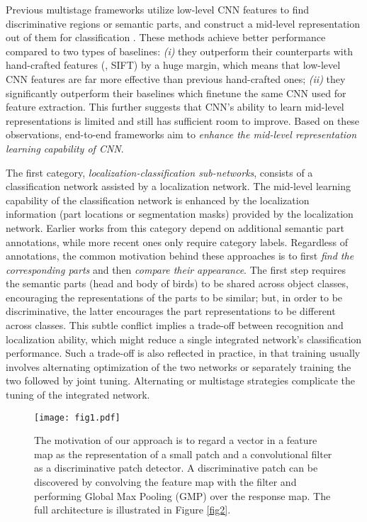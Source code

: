 \documentclass[10pt,twocolumn,letterpaper]{article}
\begin{document}
Previous multistage frameworks utilize low-level CNN features to find discriminative regions or semantic parts,
and construct a mid-level representation out of them for classification \cite{krause15, 2attention, neural_act,
mgd, deepresp, tripmine}. These methods achieve better performance compared to two types of baselines: \textit{(i)}
they outperform their counterparts with hand-crafted features
(\eg, SIFT) by a huge margin, which means that low-level CNN features are far more effective than previous hand-crafted ones;
\textit{(ii)} they significantly outperform their baselines which finetune the same CNN used for feature extraction.
This further suggests that CNN's ability to learn mid-level representations is limited and still has sufficient room to improve.
Based on these observations, end-to-end frameworks aim to \textit{enhance the mid-level representation learning capability of CNN}.

The first category, \textit{localization-classification sub-networks}, consists of a
classification network assisted by a localization network. The mid-level learning capability of the
classification network is enhanced by the localization information (\eg part locations or segmentation masks) provided by 
the localization network. Earlier works from this category \cite{fg_rcnn, deeplac, spda_cnn, partstack, maskcnn} depend
on additional semantic part annotations, while more recent ones \cite{stn, taomei1, taomei2} only require category
labels. Regardless of annotations, the common motivation behind these approaches is to first \textit{find the corresponding parts} and then
\textit{compare their appearance}. The first step requires the semantic
parts (\eg head and body of birds) to be shared across object classes, encouraging
the representations of the parts to be similar; but, in order to be discriminative, the latter encourages the part representations to be
different across classes. This subtle conflict implies a 
trade-off between recognition and localization ability, which might reduce a single integrated network's
classification performance. Such a trade-off is also reflected in practice, in that training usually
involves alternating optimization of the two networks or separately training the two followed by joint tuning.
Alternating or multistage strategies complicate the tuning of the integrated network.
\begin{figure*}[tb]
\begin{center}
\texttt{[image: fig1.pdf]}
\end{center}
\vspace{-9pt}
\caption{\label{fig1}The motivation of our approach is to regard a  vector in a feature map as the representation of a small
patch and a  convolutional filter as a discriminative patch detector. A discriminative patch can be discovered
by convolving the feature map with the  filter and performing Global Max Pooling (GMP) over the response
map. The full architecture is illustrated in Figure \ref{fig2}.}
\end{figure*}
\end{document}
